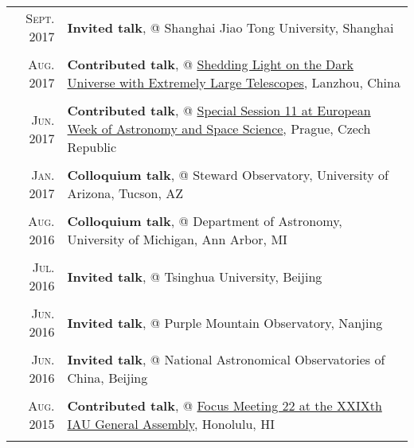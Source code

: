 \documentclass[letterpaper,12pt]{article}
\newcommand{\textwrap}{5.3in}
\begin{document}
\begin{longtable}{r|p{\textwrap}}
    \textsc{Sept. 2017}   &   \textbf{Invited talk}, @ Shanghai Jiao Tong University, Shanghai \\
    \multicolumn{2}{c}{} \\

    \textsc{Aug. 2017}   &   \textbf{Contributed talk}, @
    \href{http://darkuniverse2017.csp.escience.cn/dct/page/65580}{Shedding Light on
    the Dark Universe with Extremely Large Telescopes}, Lanzhou, China      \\
    \multicolumn{2}{c}{} \\

    \textsc{Jun. 2017}   &   \textbf{Contributed talk}, @
    \href{http://eas.unige.ch/EWASS2017/session.jsp?id=SS11}{Special Session 11 at
    European Week of Astronomy and Space Science}, Prague, Czech Republic   \\
    \multicolumn{2}{c}{} \\

    \textsc{Jan. 2017}   &   \textbf{Colloquium talk}, @ Steward Observatory, University of Arizona, Tucson, AZ \\
    \multicolumn{2}{c}{} \\

    \textsc{Aug. 2016}   &   \textbf{Colloquium talk}, @ Department of Astronomy, University of Michigan, Ann Arbor, MI \\
    \multicolumn{2}{c}{} \\

    \textsc{Jul. 2016}   &   \textbf{Invited talk}, @ Tsinghua University, Beijing \\
    \multicolumn{2}{c}{} \\


    \textsc{Jun. 2016}   &   \textbf{Invited talk}, @ Purple Mountain Observatory, Nanjing \\
    \multicolumn{2}{c}{} \\

    \textsc{Jun. 2016}   &   \textbf{Invited talk}, @ National Astronomical Observatories of China, Beijing   \\
    \multicolumn{2}{c}{} \\

    \textsc{Aug. 2015}   &   \textbf{Contributed talk}, @ \href{http://hffiau.epfl.ch/page-116896.html}{Focus Meeting 22 at the XXIXth IAU General Assembly}, Honolulu, HI     \\
    \multicolumn{2}{c}{} \\


\end{longtable}
\end{document}
